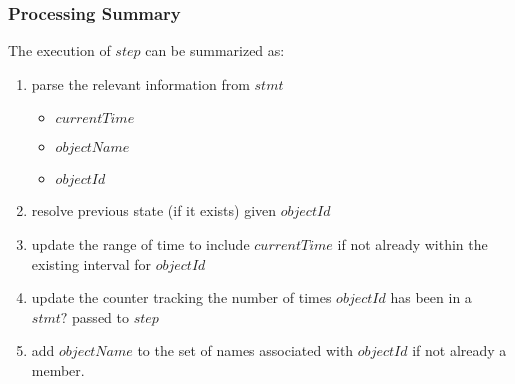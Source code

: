 \documentclass[../main.tex]{subfiles}
\begin{document}
\subsubsection{Processing Summary}
The execution of $step$ can be summarized as:
\begin{enumerate}
\item parse the relevant information from $stmt$
  \begin{itemize}
  \item $currentTime$
  \item $objectName$
  \item $objectId$
  \end{itemize}
\item resolve previous state (if it exists) given $objectId$
\item update the range of time to include $currentTime$ if not already within the existing interval for $objectId$
\item update the counter tracking the number of times $objectId$ has been in a $stmt?$ passed to $step$
\item add $objectName$ to the set of names associated with $objectId$ if not already a member.
\end{enumerate}
\end{document}
